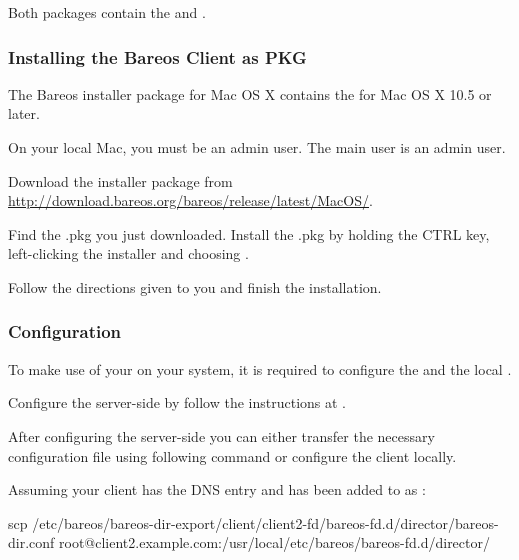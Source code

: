 Both packages contain the \bareosFd and .

%

\subsubsection{Installing the Bareos Client as PKG}

The Bareos installer package for Mac OS X contains the \bareosFd for Mac OS X 10.5 or later.

On your local Mac, you must be an admin user. The main user is an admin user.

Download the  installer package from \url{http://download.bareos.org/bareos/release/latest/MacOS/}.

Find the .pkg you just downloaded.
Install the .pkg by holding the CTRL key, left-clicking the installer and choosing .

Follow the directions given to you and finish the installation.

\subsubsection{Configuration}

To make use of your \bareosFd on your system, it is required to configure the \bareosDir and the local \bareosFd.

Configure the server-side by follow the instructions at .

After configuring the server-side you can either
transfer the necessary configuration file using following command
or configure the client locally.



Assuming your client has the DNS entry
 and has been added to \bareosDir as :

\begin{commands}{}
scp /etc/bareos/bareos-dir-export/client/client2-fd/bareos-fd.d/director/bareos-dir.conf root@client2.example.com:/usr/local/etc/bareos/bareos-fd.d/director/
\end{commands}

